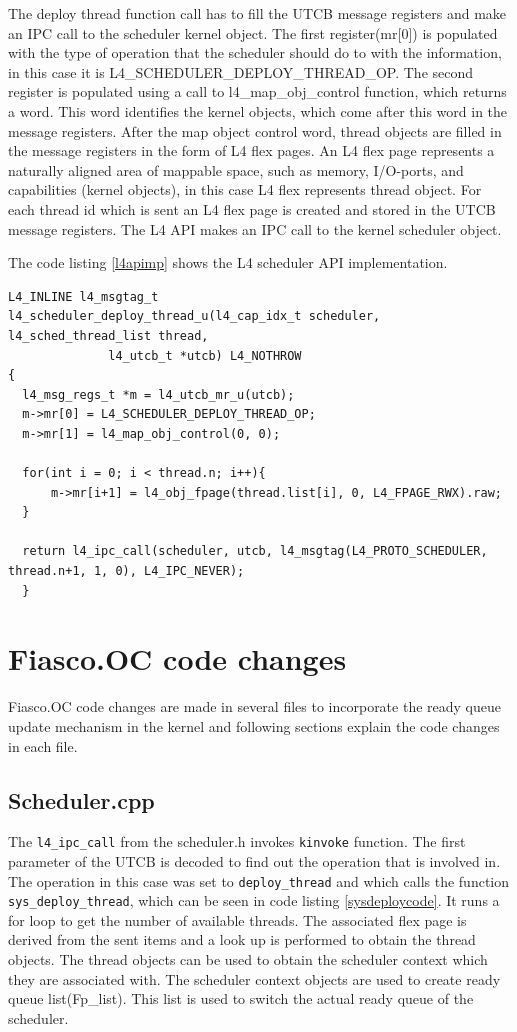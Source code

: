 The deploy thread function call has to fill the UTCB message registers and make an IPC call to the scheduler kernel object. The first register(mr[0]) is populated with the type of operation that the scheduler should do to with the information, in this case it is L4\_SCHEDULER\_DEPLOY\_THREAD\_OP. The second register is populated using a call to l4\_map\_obj\_control function, which returns a word. This word identifies the kernel objects, which come after this word in the message registers. After the map object control word, thread objects are filled in the message registers in the form of L4 flex pages. An L4 flex page represents a naturally aligned area of mappable space, such as memory, I/O-ports, and capabilities (kernel objects), in this case L4 flex represents thread object.
For each thread id which is sent an L4 flex page is created and stored in the UTCB message registers. The L4 API makes an IPC call to the kernel scheduler object. 

The code listing \ref{l4apimp} shows the L4 scheduler API implementation.

\begin{lstlisting}[caption={L4 scheduler API implementation},label={l4apimp}, style=customcpp]
L4_INLINE l4_msgtag_t
l4_scheduler_deploy_thread_u(l4_cap_idx_t scheduler, l4_sched_thread_list thread,
			  l4_utcb_t *utcb) L4_NOTHROW
{
  l4_msg_regs_t *m = l4_utcb_mr_u(utcb);
  m->mr[0] = L4_SCHEDULER_DEPLOY_THREAD_OP;
  m->mr[1] = l4_map_obj_control(0, 0);

  for(int i = 0; i < thread.n; i++){
	  m->mr[i+1] = l4_obj_fpage(thread.list[i], 0, L4_FPAGE_RWX).raw;
  }
  
  return l4_ipc_call(scheduler, utcb, l4_msgtag(L4_PROTO_SCHEDULER, thread.n+1, 1, 0), L4_IPC_NEVER);
  }
\end{lstlisting}
  
\section{Fiasco.OC code changes}
Fiasco.OC code changes are made in several files to incorporate the ready queue update mechanism in the kernel and following sections explain the code changes in each file.

\subsection{Scheduler.cpp}

The \texttt{l4\_ipc\_call} from the scheduler.h invokes \texttt{kinvoke} function. The first parameter of the UTCB is decoded to find out the operation that is involved in. The operation in this case was set to \texttt{deploy\_thread} and which calls the function \texttt{sys\_deploy\_thread}, which can be seen in code listing \ref{sysdeploycode}. It runs a for loop to get the number of available threads. The associated flex page is derived from the sent items and a look up is performed to obtain the thread objects. The thread objects can be used to obtain the scheduler context which they are associated with. The scheduler context objects are used to create ready queue list(Fp\_list). This list is used to switch the actual ready queue of the scheduler.

